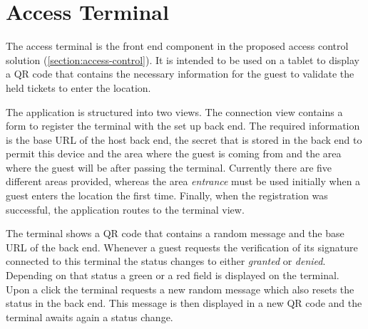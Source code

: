 \section{Access Terminal}\label{design:access-terminal}
The access terminal is the front end component in the proposed access control solution (\ref{section:access-control}). It is intended to be used on a tablet to display a QR code that contains the necessary information for the guest to validate the held tickets to enter the location.

The application is structured into two views. The connection view contains a form to register the terminal with the set up back end. The required information is the base URL of the host back end, the secret that is stored in the back end to permit this device and the area where the guest is coming from and the area where the guest will be after passing the terminal. Currently there are five different areas provided, whereas the area \textit{entrance} must be used initially when a guest enters the location the first time. Finally, when the registration was successful, the application routes to the terminal view.

The terminal shows a QR code that contains a random message and the base URL of the back end. Whenever a guest requests the verification of its signature connected to this terminal the status changes to either \textit{granted} or \textit{denied}. Depending on that status a green or a red field is displayed on the terminal. Upon a click the terminal requests a new random message which also resets the status in the back end. This message is then displayed in a new QR code and the terminal awaits again a status change.
